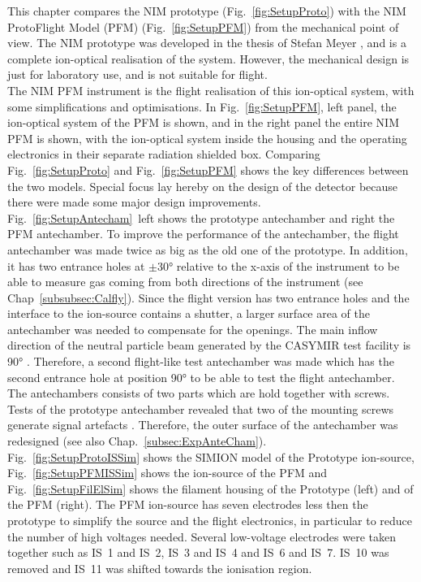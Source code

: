	This chapter compares the NIM prototype (Fig.~\ref{fig:SetupProto}) with the NIM ProtoFlight Model (PFM) (Fig.~\ref{fig:SetupPFM}) from the mechanical point of view. The NIM prototype was developed in the thesis of Stefan Meyer \cite{Diss_Meyer}, and is a complete ion-optical realisation of the system. However, the mechanical design is just for laboratory use, and is not suitable for flight.\\
	The NIM PFM instrument is the flight realisation of this ion-optical system, with some simplifications and optimisations. In Fig.~\ref{fig:SetupPFM}, left panel, the ion-optical system of the PFM is shown, and in the right panel the entire NIM PFM is shown, with the ion-optical system inside the housing and the operating electronics in their separate radiation shielded box. Comparing Fig.~\ref{fig:SetupProto} and Fig.~\ref{fig:SetupPFM} shows the key differences between the two models. Special focus lay hereby on the design of the detector because there were made some major design improvements.\\
	Fig.~\ref{fig:SetupAntecham}~left shows the prototype antechamber and right the PFM antechamber. To improve the performance of the antechamber, the flight antechamber was made twice as big as the old one of the prototype. In addition, it has two entrance holes at $\pm$30° relative to the x-axis of the instrument to be able to measure gas coming from both directions of the instrument (see Chap~\ref{subsubsec:Calfly}). Since the flight version has two entrance holes and the interface to the ion-source contains a shutter, a larger surface area of the antechamber was needed to compensate for the openings. %
	The main inflow direction of the neutral particle beam generated by the CASYMIR test facility is 90° \cite{CASYMIR_Graf2004}. Therefore, a second flight-like test antechamber was made which has the second entrance hole at position 90° to be able to test the flight antechamber.\\
	The antechambers consists of two parts which are hold together with screws. Tests of the prototype antechamber revealed that two of the mounting screws generate signal artefacts \cite{Meyer_2017_ante}. Therefore, the outer surface of the antechamber was redesigned (see also Chap.~\ref{subsec:ExpAnteCham}).\\
	Fig.~\ref{fig:SetupProtoISSim} shows the SIMION model of the Prototype ion-source, Fig.~\ref{fig:SetupPFMISSim} shows the ion-source of the PFM and Fig.~\ref{fig:SetupFilElSim} shows the filament housing of the Prototype (left) and of the PFM (right). The PFM ion-source has seven electrodes less then the prototype to simplify the source and the flight electronics, in particular to reduce the number of high voltages needed. Several low-voltage electrodes were taken together such as IS~1 and IS~2, IS~3 and IS~4 and IS~6 and IS~7. IS~10 was removed and IS~11 was shifted towards the ionisation region.\\
